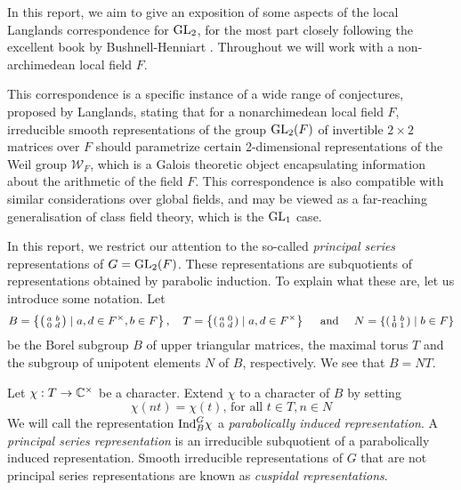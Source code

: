 In this report, we aim to give an exposition of some aspects of the local Langlands correspondence for $\mathrm{GL}_2$, for the most part closely following the excellent book by Bushnell-Henniart \cite{BH1}. Throughout we will work with a non-archimedean local field $F$.

This correspondence is a specific instance of a wide range of conjectures, proposed by Langlands, stating that for a nonarchimedean local field $F$, irreducible smooth representations of the group $\mathrm{GL}_2(F)$ of invertible $2\times 2$ matrices over $F$ should parametrize certain 2-dimensional representations of the Weil group $\mathcal{W}_F$, which is a Galois theoretic object encapsulating information about the arithmetic of the field $F$. This correspondence is also compatible with similar considerations over global fields, and may be viewed as a far-reaching generalisation of class field theory, which is the $\mathrm{GL}_1$ case. 

In this report, we restrict our attention to the so-called \emph{principal series} representations of $G = \mathrm{GL}_2(F)$. These representations are subquotients of representations obtained by parabolic induction. To explain what these are, let us introduce some notation. Let $$B=\left\{\begin{psmallmatrix} a&b\\0&d\end{psmallmatrix} \mid a,d \in F^\times, b \in F\right\},\quad T=\left\{\begin{psmallmatrix}
	a&0\\0&d
\end{psmallmatrix}\mid a,d \in F^\times\right\}\quad\text{ and }\quad N=\left\{\begin{psmallmatrix}
	1&b\\0&1
\end{psmallmatrix}\mid b \in F\right\}$$ be the Borel subgroup $B$ of upper triangular matrices, the maximal torus $T$ and the subgroup of unipotent elements $N$ of $B$, respectively. We see that $B = NT$.
\begin{defn}
	Let $\chi: T\to \mathbb{C}^\times$ be a character. Extend $\chi$ to a character of $B$ by setting
	\[\chi(nt) = \chi(t)\text{, for all } t\in T, n\in N\]
	We will call the representation $\mathrm{Ind}_B^G \chi$ a \emph{parabolically induced representation}. A \emph{principal series representation} is an irreducible subquotient of a parabolically induced representation. Smooth irreducible representations of $G$ that are not principal series representations are known as \emph{cuspidal representations}.
\end{defn}

